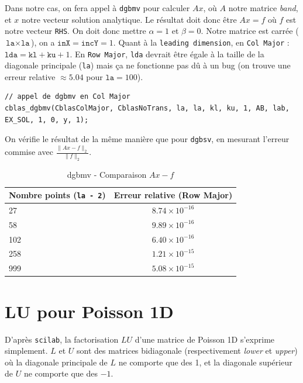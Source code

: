\documentclass{article}
\begin{document}
Dans notre cas, on fera appel à \texttt{dgbmv} pour calculer \(Ax\), où $A$ notre matrice \textit{band}, et $x$ notre vecteur solution analytique. Le résultat doit donc être \(Ax = f\) où $f$ est notre vecteur \texttt{RHS}. On doit donc mettre $\alpha = 1$ et $\beta = 0$. Notre matrice est carrée ($\texttt{la} \times \texttt{la}$), on a $\texttt{inX} = \texttt{incY} = 1$. Quant à la \texttt{leading dimension}, en \texttt{Col Major} : $\texttt{lda} = \texttt{kl} + \texttt{ku} + 1$. En \texttt{Row Major}, \texttt{lda} devrait être égale à la taille de la diagonale principale (\texttt{la}) mais ça ne fonctionne pas dû à un bug (on trouve une erreur relative $\approx 5.04$ pour $\texttt{la}=100$).
\begin{scriptsize}
\begin{verbatim}
// appel de dgbmv en Col Major
cblas_dgbmv(CblasColMajor, CblasNoTrans, la, la, kl, ku, 1, AB, lab, EX_SOL, 1, 0, y, 1);
\end{verbatim}
\end{scriptsize}

On vérifie le résultat de la même manière que pour \texttt{dgbsv}, en mesurant l'erreur commise avec \(\frac{\lVert Ax - f \rVert_2}{\lVert f \rVert_2}\).

 \begin{table}[H]
\caption{dgbmv - Comparaison $Ax - f$}
\centering
\renewcommand*\arraystretch{1.1}
\begin{tabular}{|l|c|}
  \hline
  Nombre points (\texttt{la - 2}) & Erreur relative (Row Major) \\
  \hline
	27	&	\(8.74 \times 10^{-16}\) \\
	58	&	\(9.89 \times 10^{-16}\) \\
	102	&	\(6.40 \times 10^{-16}\) \\
	258	&	\(1.21 \times 10^{-15}\) \\
	999	&	\(5.08 \times 10^{-15}\) \\
  \hline
\end{tabular}
\end{table}

\section{LU pour Poisson 1D}

D'après \texttt{scilab}, la factorisation $LU$ d'une matrice de Poisson 1D s'exprime simplement. $L$ et $U$ sont des matrices bidiagonale (respectivement \textit{lower} et \textit{upper}) où la diagonale principale de $L$ ne comporte que des 1, et la diagonale supérieur de $U$ ne comporte que des $-1$.
\end{document}
